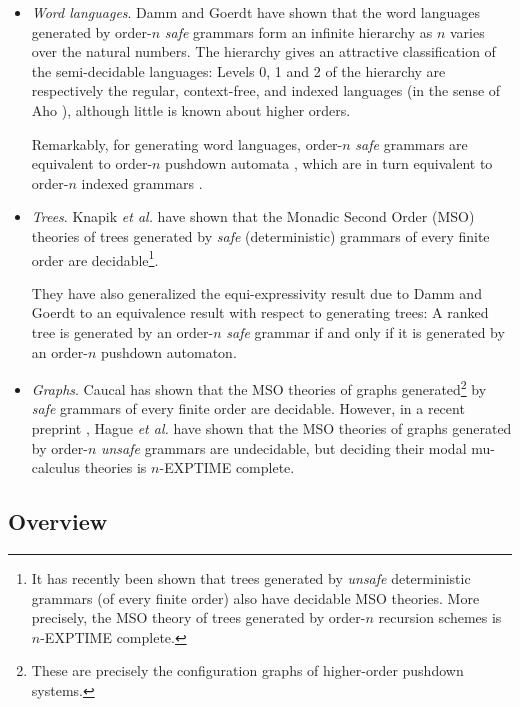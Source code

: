 \begin{itemize}
\item \emph{Word languages}. Damm and Goerdt \cite{DG86} have shown
  that the word languages generated by order-$n$ \emph{safe} grammars
  form an infinite hierarchy as $n$ varies over the natural numbers.
  The hierarchy gives an attractive classification of the
  semi-decidable languages: Levels 0, 1 and 2 of the hierarchy are
  respectively the regular, context-free, and indexed languages (in
  the sense of Aho \cite{Aho68}), although little is known about
  higher orders.

  Remarkably, for generating word languages, order-$n$ \emph{safe}
  grammars are equivalent to order-$n$ pushdown automata \cite{DG86},
  which are in turn equivalent to order-$n$ indexed grammars
  \cite{Mas74,Mas76}.

\item \emph{Trees}. Knapik \emph{et al.} have shown that the Monadic
  Second Order (MSO) theories of trees generated by \emph{safe}
  (deterministic) grammars of every finite order are
  decidable\footnote{It has recently been shown
    \cite{OngLics2006} that trees generated by \emph{unsafe}
    deterministic grammars (of every finite order) also have decidable
    MSO theories. More precisely, the MSO theory of trees generated by order-$n$
recursion schemes is $n$-EXPTIME complete.}. 

  They have also generalized the equi-expressivity result due to Damm
  and Goerdt \cite{DG86} to an equivalence result with respect to
  generating trees: A ranked tree is generated by an order-$n$ \emph{safe}
  grammar if and only if it is generated by an order-$n$ pushdown
  automaton.

\item \emph{Graphs}. Caucal \cite{Cau02} has shown that the MSO
  theories of graphs generated\footnote{These are precisely the
    configuration graphs of higher-order pushdown systems.} by
  \emph{safe} grammars of every finite order are decidable. However,
  in a recent preprint \cite{hague-sto07}, Hague \emph{et al.} have
  shown that the MSO theories of graphs generated by order-$n$
  \emph{unsafe} grammars are undecidable, but deciding their modal
  mu-calculus theories is $n$-EXPTIME complete.
\end{itemize}

\subsection*{Overview}


